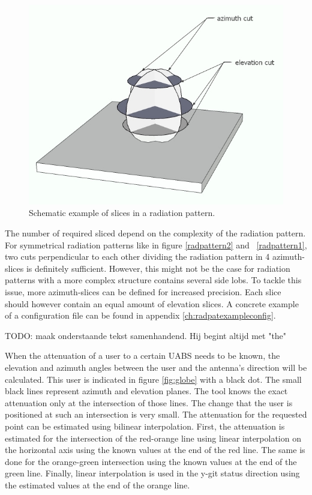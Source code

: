 \begin{figure}[H]
  \includegraphics[width=\textwidth]{../images/3Dimages/slicesOfPattern.jpg}
  \caption{Schematic example of slices in a radiation pattern.}
  \label{fig:slicesOfPattern}
\end{figure}

The number of required sliced depend on the complexity of the radiation pattern. For symmetrical radiation patterns like 
in figure \ref{radpattern2} and  \ref{radpattern1}, two cuts perpendicular to each other dividing the radiation pattern in 4 azimuth-slices 
is definitely sufficient. However, this might not be the case for radiation patterns with a more complex structure contains several  
side lobs. To tackle this issue, more azimuth-slices can be defined for increased precision. Each slice should however contain an equal amount 
of elevation slices.  A concrete example of a configuration file can be found in appendix \ref{ch:radpatexampleconfig}.

TODO: maak onderstaande tekst samenhandend. Hij begint altijd met "the"

When the attenuation of a user to a certain \gls{UABS} needs to be known, the elevation and azimuth angles between the user and the antenna's direction 
will be calculated. This user is indicated in figure \ref{fig:globe} with a black dot. The small black lines represent azimuth and elevation planes. 
The tool knows the exact attenuation only at the intersection of those lines. 
The change that the user is positioned at such an intersection is very small. The attenuation for the requested point can be estimated using bilinear interpolation.
First, the attenuation is estimated for the intersection of the red-orange line using linear interpolation on the horizontal axis using the known values
 at the end of the red line. The same is done for the orange-green intersection using the known values at the end of the green line. Finally, linear interpolation
is used in the y-git status direction using the estimated values at the end of the orange line.

